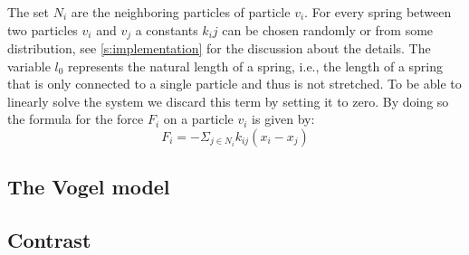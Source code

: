 %
The set $N_i$ are the neighboring particles of particle $v_i$. For every spring between two particles $v_i$ and $v_j$ a constants $k_ij$ can be chosen randomly or from some distribution, see \cref{s:implementation} for the discussion about the details. The variable $l_0$ represents the natural length of a spring, i.e., the length of a spring that is only connected to a single particle and thus is not stretched. To be able to linearly solve the system we discard this term by setting it to zero. By doing so the formula for the force $F_i$ on a particle $v_i$ is given by:
%
\begin{equation}\label{eq:single:forcle:simple}
	F_i = - \Sigma_{j \in N_i} k_{ij}(x_i - x_j)
\end{equation}




\subsection{The Vogel model}\label{ss:method:vogel}


\subsection{Contrast}\label{ss:method:contrast}




